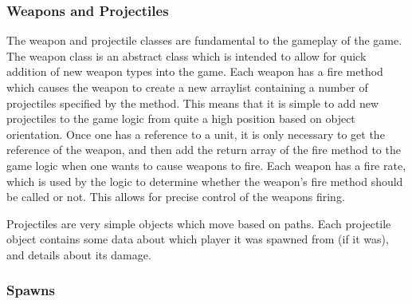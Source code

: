 \subsubsection{Weapons and Projectiles}
The weapon and projectile classes are fundamental to the gameplay of the game. The weapon class is an abstract class which is intended to allow for quick addition of new weapon types into the game. Each weapon has a fire method which causes the weapon to create a new arraylist containing a number of projectiles specified by the method. This means that it is simple to add new projectiles to the game logic from quite a high position based on object orientation. Once one has a reference to a unit, it is only necessary to get the reference of the weapon, and then add the return array of the fire method to the game logic when one wants to cause weapons to fire. Each weapon has a fire rate, which is used by the logic to determine whether the weapon's fire method should be called or not. This allows for precise control of the weapons firing.

Projectiles are very simple objects which move based on paths. Each projectile object contains some data about which player it was spawned from (if it was), and details about its damage.
\subsubsection{Spawns}

